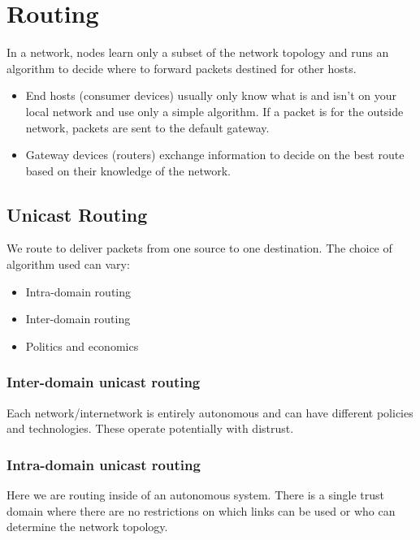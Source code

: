 \section{Routing}\label{sec:routing}

In a network, nodes learn only a subset of the network topology and runs an algorithm to decide where to forward packets destined for other hosts.

\begin{itemize}
	\item End hosts (consumer devices) usually only know what is and isn't on your local network and use only a simple algorithm.
	      If a packet is for the outside network, packets are sent to the default gateway.
	\item Gateway devices (routers) exchange information to decide on the best route based on their knowledge of the network.
\end{itemize}

\subsection{Unicast Routing}\label{sub:unicast_routing}

We route to deliver packets from one source to one destination.
The choice of algorithm used can vary:
\begin{itemize}
	\item Intra-domain routing
	\item Inter-domain routing
	\item Politics and economics
\end{itemize}

\subsubsection{Inter-domain unicast routing}\label{ssub:inter_domain_unicast_routing}

Each network/internetwork is entirely autonomous and can have different policies and technologies.
These operate potentially with distrust.

\subsubsection{Intra-domain unicast routing}\label{ssub:intra_domain_unicast_routing}

Here we are routing inside of an autonomous system.
There is a single trust domain where there are no restrictions on which links can be used or who can determine the network topology.

